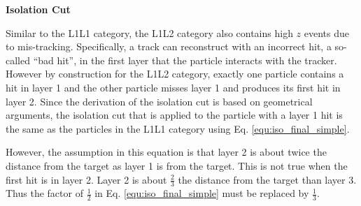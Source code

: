 
\clearpage


\textbf{Isolation Cut}

Similar to the L1L1 category, the L1L2 category also contains high $z$ events due to mis-tracking. Specifically, a track can reconstruct with an incorrect hit, a so-called ``bad hit'', in the first layer that the particle interacts with the tracker. However by construction for the L1L2 category, exactly one particle contains a hit in layer 1 and the other particle misses layer 1 and produces its first hit in layer 2. Since the derivation of the isolation cut is based on geometrical arguments, the isolation cut that is applied to the particle with a layer 1 hit is the same as the particles in the L1L1 category using Eq. \ref{equ:iso_final_simple}.

However, the assumption in this equation is that layer 2 is about twice the distance from the target as layer 1 is from the target. This is not true when the first hit is in layer 2. Layer 2 is about $\frac{2}{3}$ the distance from the target than layer 3. Thus the factor of $\frac{1}{2}$ in Eq. \ref{equ:iso_final_simple} must be replaced by $\frac{1}{3}$.

